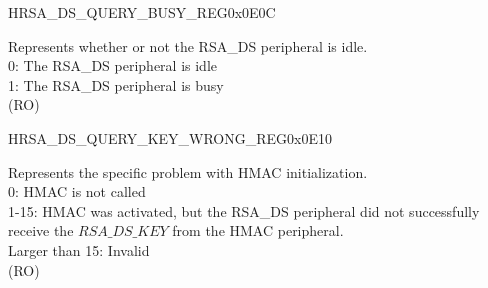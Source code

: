 \begin{register}{H}{RSA\_DS\_QUERY\_BUSY\_REG}{0x0E0C}\label{regdesc:RSADSQUERYBUSYREG}
%
%
\regnewline%
\begin{regdesc}\begin{reglist}
\label{fielddesc:RSADSQUERYBUSY}\item [RSA\_DS\_QUERY\_BUSY] Represents whether or not the RSA\_DS peripheral is idle.\\
0: The RSA\_DS peripheral is idle\\
1: The RSA\_DS peripheral is busy\\ (RO)
\end{reglist}\end{regdesc}
\end{register}


\begin{register}{H}{RSA\_DS\_QUERY\_KEY\_WRONG\_REG}{0x0E10}\label{regdesc:RSADSQUERYKEYWRONGREG}
%
%
\regnewline%
\begin{regdesc}\begin{reglist}
\label{fielddesc:RSADSQUERYKEYWRONG}\item [RSA\_DS\_QUERY\_KEY\_WRONG] Represents the specific problem with HMAC initialization.\\
0: HMAC is not called\\
1-15: HMAC was activated, but the RSA\_DS peripheral did not successfully receive the \begin{math}RSA\_DS\_KEY\end{math} from the HMAC peripheral.\\
Larger than 15: Invalid\\
(RO)
\end{reglist}\end{regdesc}
\end{register}


